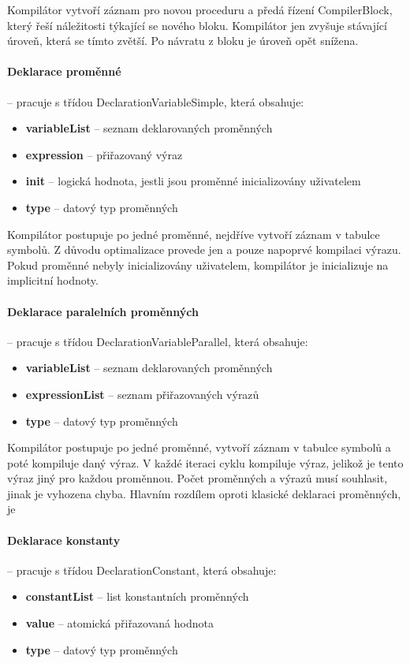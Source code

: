 \documentclass[
12pt,
a4paper,
pdftex,
czech,
titlepage
]{report}
\begin{document}
Kompilátor vytvoří záznam pro novou proceduru a předá řízení CompilerBlock, který řeší náležitosti týkající se nového bloku. Kompilátor jen zvyšuje stávající úroveň, která se tímto zvětší. Po návratu z bloku je úroveň opět snížena.

\paragraph{Deklarace proměnné} -- pracuje s třídou DeclarationVariableSimple, která obsahuje:
\begin{itemize}
\item \textbf{variableList} -- seznam deklarovaných proměnných
\item \textbf{expression} -- přiřazovaný výraz
\item \textbf{init} -- logická hodnota, jestli jsou proměnné inicializovány uživatelem
\item \textbf{type} -- datový typ proměnných
\end{itemize} 

Kompilátor postupuje po jedné proměnné, nejdříve vytvoří záznam v tabulce symbolů. Z důvodu optimalizace provede jen a pouze napoprvé kompilaci výrazu. Pokud proměnné nebyly inicializovány uživatelem, kompilátor je inicializuje na implicitní hodnoty.

\paragraph{Deklarace paralelních proměnných} -- pracuje s třídou DeclarationVariableParallel, která obsahuje:
\begin{itemize}
\item \textbf{variableList} -- seznam deklarovaných proměnných
\item \textbf{expressionList} -- seznam přiřazovaných výrazů
\item \textbf{type} -- datový typ proměnných
\end{itemize}

Kompilátor postupuje po jedné proměnné, vytvoří záznam v tabulce symbolů a poté kompiluje daný výraz. V každé iteraci cyklu kompiluje výraz, jelikož je tento výraz jiný pro každou proměnnou. Počet proměnných a výrazů musí souhlasit, jinak je vyhozena chyba. Hlavním rozdílem oproti klasické deklaraci proměnných, je 

\paragraph{Deklarace konstanty} -- pracuje s třídou DeclarationConstant, která obsahuje:
\begin{itemize}
\item \textbf{constantList} -- list konstantních proměnných
\item \textbf{value} -- atomická přiřazovaná hodnota
\item \textbf{type} -- datový typ proměnných
\end{itemize}
\end{document}

